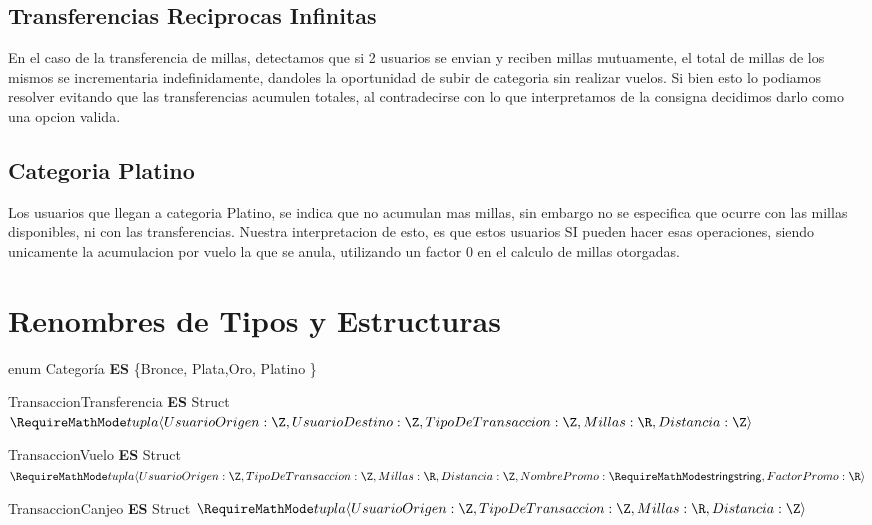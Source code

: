 \documentclass[11pt,a4paper]{article}
\newcommand{\Tipo}[1]{\mathsf{#1}}
\begin{document}
\subsection{Transferencias Reciprocas Infinitas}
En el caso de la transferencia de millas, detectamos que si 2 usuarios se envian y reciben millas mutuamente, el total de millas de los mismos se incrementaria indefinidamente, dandoles la oportunidad de subir de categoria sin realizar vuelos. Si bien esto lo podiamos resolver evitando que las transferencias acumulen totales, al contradecirse con lo que interpretamos de la consigna decidimos darlo como una opcion valida.

\subsection{Categoria Platino}
Los usuarios que llegan a categoria Platino, se indica que no acumulan mas millas, sin embargo no se especifica que ocurre con las millas disponibles, ni con las transferencias. Nuestra interpretacion de esto, es que estos usuarios SI pueden hacer esas operaciones, siendo unicamente la acumulacion por vuelo la que se anula, utilizando un factor 0 en el calculo de millas otorgadas.

\section{Renombres de Tipos y Estructuras}

\noindent enum Categoría \textbf{ES} \{Bronce, Plata,Oro, Platino  \}

\vspace{0.5cm}

\noindent TransaccionTransferencia \textbf{ES} Struct $\tupla{
		UsuarioOrigen: \Tipo{\Z}, \\
		UsuarioDestino: \Tipo{\Z},
		TipoDeTransaccion: \Tipo{\Z},
		Millas: \Tipo{\R}, \\
		Distancia: \Tipo{\Z}
	}$

\vspace{1cm}
\noindent TransaccionVuelo \textbf{ES} Struct $\tupla{
		UsuarioOrigen: \Tipo{\Z},
		TipoDeTransaccion: \Tipo{\Z},
		Millas: \Tipo{\R}, \\
		Distancia: \Tipo{\Z},
		NombrePromo: \Tipo{\str},
		FactorPromo: \Tipo{\R}
	}$

\vspace{1cm}
\noindent TransaccionCanjeo  \textbf{ES} Struct $\tupla{
		UsuarioOrigen: \Tipo{\Z},
		TipoDeTransaccion: \Tipo{\Z},
		Millas: \Tipo{\R}, \\
		Distancia: \Tipo{\Z}
	}$
\end{document}
